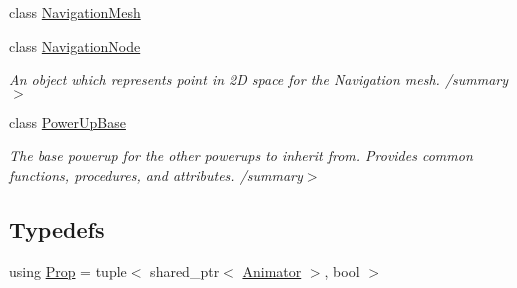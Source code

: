\begin{DoxyCompactItemize}
class \hyperlink{class_engine_1_1_core_1_1_navigation_mesh}{Navigation\+Mesh}
\item 
class \hyperlink{struct_engine_1_1_core_1_1_navigation_node}{Navigation\+Node}
\begin{DoxyCompactList}\small\item\em An object which represents point in 2D space for the Navigation mesh. /summary$>$ \end{DoxyCompactList}\item 
class \hyperlink{class_engine_1_1_core_1_1_power_up_base}{Power\+Up\+Base}
\begin{DoxyCompactList}\small\item\em The base powerup for the other powerups to inherit from. Provides common functions, procedures, and attributes. /summary$>$ \end{DoxyCompactList}\end{DoxyCompactItemize}
\subsection*{Typedefs}
\begin{DoxyCompactItemize}
\item 
using \hyperlink{namespace_engine_1_1_core_aa19279815c8e1c96d68332fcaa7d59d8}{Prop} = tuple$<$ shared\+\_\+ptr$<$ \hyperlink{class_engine_1_1_core_1_1_animator}{Animator} $>$, bool $>$
\end{DoxyCompactItemize}
